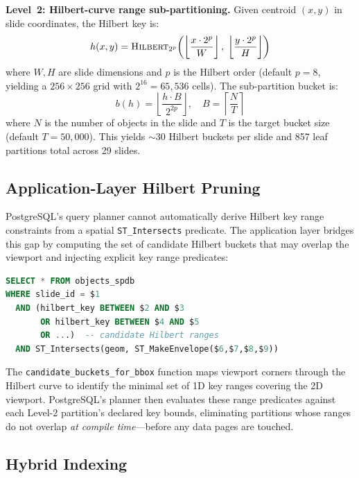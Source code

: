 \documentclass[sigconf]{acmart}
\begin{document}
\textbf{Level~2: Hilbert-curve range sub-partitioning.}
Given centroid $(x,y)$ in slide coordinates, the Hilbert key is:
\begin{equation}
h(x, y) = \textsc{Hilbert}_{2^p}\!\left(\left\lfloor \frac{x \cdot 2^p}{W} \right\rfloor,\; \left\lfloor \frac{y \cdot 2^p}{H} \right\rfloor\right)
\label{eq:hilbert_key}
\end{equation}
where $W, H$ are slide dimensions and $p$ is the Hilbert order (default $p=8$, yielding a $256 \times 256$ grid with $2^{16} = 65{,}536$ cells).
The sub-partition bucket is:
\begin{equation}
b(h) = \left\lfloor \frac{h \cdot B}{2^{2p}} \right\rfloor, \quad B = \left\lceil \frac{N}{T} \right\rceil
\label{eq:bucket}
\end{equation}
where $N$ is the number of objects in the slide and $T$ is the target bucket size (default $T = 50{,}000$).
This yields $\sim$30 Hilbert buckets per slide and 857 leaf partitions total across 29 slides.

\subsection{Application-Layer Hilbert Pruning}
\label{sec:app_pruning}

PostgreSQL's query planner cannot automatically derive Hilbert key range constraints from a spatial \texttt{ST\_Intersects} predicate.
The application layer bridges this gap by computing the set of candidate Hilbert buckets that may overlap the viewport and injecting explicit key range predicates:

\begin{lstlisting}[language=SQL,caption={SPDB viewport query with Hilbert pruning predicates.},label={lst:pruning_query}]
SELECT * FROM objects_spdb
WHERE slide_id = $1
  AND (hilbert_key BETWEEN $2 AND $3
       OR hilbert_key BETWEEN $4 AND $5
       OR ...)  -- candidate Hilbert ranges
  AND ST_Intersects(geom, ST_MakeEnvelope($6,$7,$8,$9))
\end{lstlisting}

The \texttt{candidate\_buckets\_for\_bbox} function maps viewport corners through the Hilbert curve to identify the minimal set of 1D key ranges covering the 2D viewport.
PostgreSQL's planner then evaluates these range predicates against each Level-2 partition's declared key bounds, eliminating partitions whose ranges do not overlap \emph{at compile time}---before any data pages are touched.

\subsection{Hybrid Indexing}
\label{sec:hybrid_index}
\end{document}
